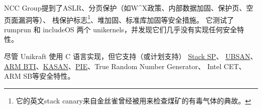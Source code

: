 \documentclass{../runikraft-report}
\begin{document}
NCC Group提到了ASLR、分页保护（如W\^{}X政策、内部数据加固、保护页、空页面漏洞等）、
栈保护标志\footnote{它的英文stack canary来自金丝雀曾经被用来检查煤矿的有毒气体的典故\cite{bib:canary}。}、堆加固、标准库加固等安全措施。
它测试了 rumprun 和 includeOS 两个 unikernels，并发现它们几乎没有实现任何安全特性。

尽管 Unikraft 使用 C 语言实现，但它支持（或计划支持）
\href{https://github.com/unikraft/unikraft/tree/staging/lib/uksp}{Stack SP}、
\href{https://github.com/unikraft/unikraft/tree/staging/lib/ubsan}{UBSAN}、
\href{https://github.com/unikraft/unikraft/pull/421}{ARM BTI}、\href{https://github.com/unikraft/unikraft/pull/191}{KASAN}、\href{https://github.com/unikraft/unikraft/pull/239}{PIE}、True Random Number Generator、
Intel CET、ARM SB等安全特性。\cite{bib:unikraft-secuirty}

\end{document}
